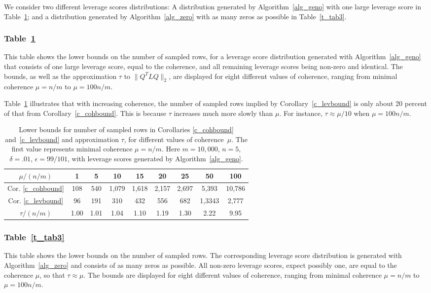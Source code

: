 \documentclass{siamltex}
\begin{document}
We consider two different leverage scores distributions: A distribution 
generated by Algorithm~\ref{alg_geno} 
with one large leverage score in Table~\ref{t_tab2};
and a distribution generated by Algorithm~\ref{alg_zero} with as many zeros 
as possible in Table~\ref{t_tab3}.

\subsubsection*{Table~\ref{t_tab2}}
This table shows the lower bounds on the number of sampled rows, 
for a leverage score distribution 
generated with Algorithm~\ref{alg_geno} that consists of
one large leverage score, equal to the coherence,
and all remaining leverage scores being non-zero and identical.
The bounds, as well as the approximation $\tau$ to $\|Q^TLQ\|_2$,
are displayed for eight different values of coherence, ranging 
from minimal coherence $\mu=n/m$ to $\mu =100n/m$.

Table~\ref{t_tab2} illustrates that with increasing coherence, the
number of sampled rows implied by Corollary~\ref{c_levbound} is only
about 20 percent of that from Corollary~\ref{c_cohbound}. This is because 
$\tau$ increases much more slowly than $\mu$. For instance, 
 $\tau\approx \mu/10$ when $\mu=100n/m$.

\begin{table}
\begin{center}
\begin{tabular}{|c||c|c|c|c|c|c|c|c|}
\hline
$\mu/(n/m)$ & 1 & 5 & 10 & 15 & 20 &25 &50& 100\\
\hline\hline 
Cor. \ref{c_cohbound} & 108 & 540 & 1,079 & 1,618 & 2,157 &2,697 &5,393 &10,786\\
Cor. \ref{c_levbound} & 96  & 191 & 310   & 432   & 556   &682   &1,3343 & 2,777\\
\hline
$\tau/(n/m)$ & 1.00 & 1.01 & 1.04   & 1.10 &1.19 & 1.30 & 2.22 &9.95\\
\hline
\end{tabular}
\end{center}
\bigskip
\caption{Lower bounds for number of sampled rows in Corollaries
\ref{c_cohbound} and~\ref{c_levbound}
and approximation $\tau$, for different values of coherence~$\mu$.  
The first value represents minimal coherence $\mu=n/m$.
Here $m=10,000$, $n=5$, $\delta=.01$, $\epsilon=99/101$, with
leverage scores generated by Algorithm~\ref{alg_geno}.}\label{t_tab2}
\end{table}

\subsubsection*{Table~\ref{t_tab3}}
This table shows the lower bounds on the number of sampled rows. The corresponding
leverage score distribution is
generated with Algorithm~\ref{alg_zero} and consists of
as many zeros as possible. All non-zero leverage
scores, expect possibly one, are equal to the coherence $\mu$, so that 
$\tau\approx\mu$.
The bounds are displayed for eight different values of coherence, ranging 
from minimal coherence $\mu=n/m$ to $\mu =100n/m$.
\end{document}
